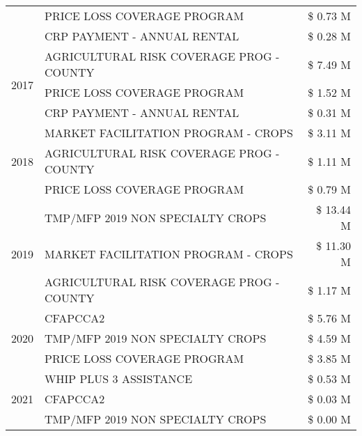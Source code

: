 \begin{tabular}{llr}
 & PRICE LOSS COVERAGE PROGRAM & \$ 0.73 M \\
 & CRP PAYMENT - ANNUAL RENTAL & \$ 0.28 M \\
\cline{1-3}
\multirow[t]{3}{*}{2017} & AGRICULTURAL RISK COVERAGE PROG - COUNTY & \$ 7.49 M \\
 & PRICE LOSS COVERAGE PROGRAM & \$ 1.52 M \\
 & CRP PAYMENT - ANNUAL RENTAL & \$ 0.31 M \\
\cline{1-3}
\multirow[t]{3}{*}{2018} & MARKET FACILITATION PROGRAM - CROPS & \$ 3.11 M \\
 & AGRICULTURAL RISK COVERAGE PROG - COUNTY & \$ 1.11 M \\
 & PRICE LOSS COVERAGE PROGRAM & \$ 0.79 M \\
\cline{1-3}
\multirow[t]{3}{*}{2019} & TMP/MFP 2019 NON SPECIALTY CROPS & \$ 13.44 M \\
 & MARKET FACILITATION PROGRAM - CROPS & \$ 11.30 M \\
 & AGRICULTURAL RISK COVERAGE PROG - COUNTY & \$ 1.17 M \\
\cline{1-3}
\multirow[t]{3}{*}{2020} & CFAPCCA2 & \$ 5.76 M \\
 & TMP/MFP 2019 NON SPECIALTY CROPS & \$ 4.59 M \\
 & PRICE LOSS COVERAGE PROGRAM & \$ 3.85 M \\
\cline{1-3}
\multirow[t]{3}{*}{2021} & WHIP PLUS 3 ASSISTANCE & \$ 0.53 M \\
 & CFAPCCA2 & \$ 0.03 M \\
 & TMP/MFP 2019 NON SPECIALTY CROPS & \$ 0.00 M \\
\cline{1-3}
\bottomrule
\end{tabular}

